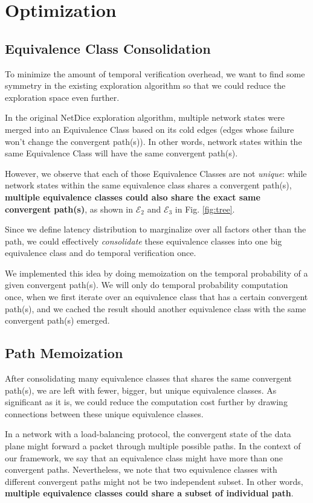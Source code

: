 \documentclass[10pt,sigconf,letterpaper,anonymous,nonacm]{acmart}
\begin{document}
\section{Optimization}
\subsection{Equivalence Class Consolidation}
To minimize the amount of temporal verification overhead, we want to find some symmetry in the 
existing exploration algorithm so that we could reduce the exploration space even further.

In the original NetDice exploration algorithm, multiple network states were merged into an Equivalence 
Class based on its cold edges (edges whose failure won't change the convergent path(s)).
In other words, network states within the same Equivalence Class will have the same convergent path(s).

However, we observe that each of those Equivalence Classes are not \textit{unique}: while network states within 
the same equivalence class shares a convergent path(s), \textbf{multiple equivalence classes could also 
share the exact same convergent path(s)}, as shown in $\mathcal{E}_2$ and $\mathcal{E}_3$ in Fig. \ref{fig:tree}.

Since we define latency distribution to marginalize over all factors other than the path, we could 
effectively \textit{consolidate} these equivalence classes into one big equivalence class and do temporal 
verification once.

We implemented this idea by doing memoization on the temporal probability of a given convergent path(s).
We will only do temporal probability computation once, when we first iterate over an equivalence class that 
has a certain convergent path(s), and we cached the result should another equivalence class with the same 
convergent path(s) emerged.

\subsection{Path Memoization}
After consolidating many equivalence classes that shares the same convergent path(s), we are left with fewer, 
bigger, but unique equivalence classes.
As significant as it is, we could reduce the computation cost further by drawing connections between these 
unique equivalence classes.

In a network with a load-balancing protocol, the convergent state of the data plane might forward a packet 
through multiple possible paths.
In the context of our framework, we say that an equivalence class might have more than one convergent paths.
Nevertheless, we note that two equivalence classes with different convergent paths might not be two 
independent subset.
In other words, \textbf{multiple equivalence classes could share a subset of individual path}.
\end{document}
